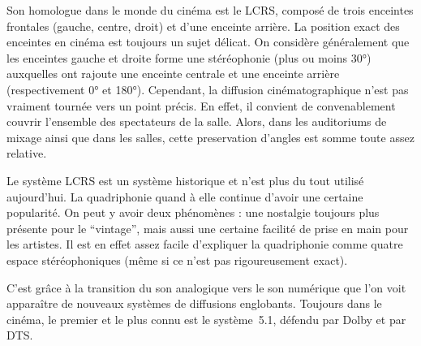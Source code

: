 \documentclass[
  letterpaper,
  DIV=11,
  numbers=noendperiod]{scrreprt}
\begin{document}
Son homologue dans le monde du cinéma est le LCRS, composé de trois
enceintes frontales (gauche, centre, droit) et d'une enceinte arrière.
La position exact des enceintes en cinéma est toujours un sujet délicat.
On considère généralement que les enceintes gauche et droite forme une
stéréophonie (plus ou moins 30°) auxquelles ont rajoute une enceinte
centrale et une enceinte arrière (respectivement 0° et 180°). Cependant,
la diffusion cinématographique n'est pas vraiment tournée vers un point
précis. En effet, il convient de convenablement couvrir l'ensemble des
spectateurs de la salle. Alors, dans les auditoriums de mixage ainsi que
dans les salles, cette preservation d'angles est somme toute assez
relative.

\begin{tcolorbox}[enhanced jigsaw, leftrule=.75mm, arc=.35mm, bottomtitle=1mm, colback=white, colbacktitle=quarto-callout-tip-color!10!white, opacityback=0, left=2mm, rightrule=.15mm, opacitybacktitle=0.6, breakable, toptitle=1mm, titlerule=0mm, bottomrule=.15mm, toprule=.15mm, coltitle=black, title=\textcolor{quarto-callout-tip-color}{\faLightbulb}\hspace{0.5em}{Astuce}]

Le système LCRS est un système historique et n'est plus du tout utilisé
aujourd'hui. La quadriphonie quand à elle continue d'avoir une certaine
popularité. On peut y avoir deux phénomènes : une nostalgie toujours
plus présente pour le ``vintage'', mais aussi une certaine facilité de
prise en main pour les artistes. Il est en effet assez facile
d'expliquer la quadriphonie comme quatre espace stéréophoniques (même si
ce n'est pas rigoureusement exact).

\end{tcolorbox}

C'est grâce à la transition du son analogique vers le son numérique que
l'on voit apparaître de nouveaux systèmes de diffusions englobants.
Toujours dans le cinéma, le premier et le plus connu est le système~5.1,
défendu par Dolby et par DTS.
\end{document}
